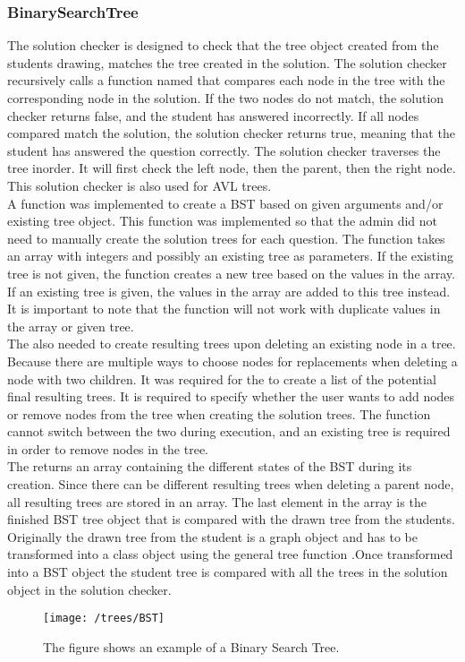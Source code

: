 \subsubsection{BinarySearchTree}
The solution checker is designed to check that the tree object created from the students drawing, matches the tree created in the solution. The solution checker recursively calls a function named  that compares each node in the tree with the corresponding node in the solution. If the two nodes do not match, the solution checker returns false, and the student has answered incorrectly. If all nodes compared match the solution, the solution checker returns true, meaning that the student has answered the question correctly. The solution checker traverses the tree inorder. It will first check the left node, then the parent, then the right node. This solution checker is also used for AVL trees.
\\[11pt]
A function  was implemented to create a BST based on given arguments and/or existing tree object. This function was implemented so that the admin did not need to manually create the solution trees for each question. The function takes an array with integers and possibly an existing tree as parameters. If the existing tree is not given, the function creates a new tree based on the values in the array. If an existing tree is given, the values in the array are added to this tree instead. It is important to note that the function will not work with duplicate values in the array or given tree.
\\[11pt]
The  also needed to create resulting trees upon deleting an existing node in a tree. Because there are multiple ways to choose nodes for replacements when deleting a node with two children.\cite{BinaryTree} It was required for the  to create a list of the potential final resulting trees. It is required to specify whether the user wants to add nodes or remove nodes from the tree when creating the solution trees. The function cannot switch between the two during execution, and an existing tree is required in order to remove nodes in the tree.
\\[11pt]
The  returns an array containing the different states of the BST during its creation. Since there can be different resulting trees when deleting a parent node, all resulting trees are stored in an array. The last element in the array is the finished BST tree object that is compared with the drawn tree from the students. Originally the drawn tree from the student is a graph object and has to be transformed into a  class object using the general tree function .Once transformed into a BST object the student tree is compared with all the trees in the solution object in the solution checker.
\begin{figure}[H]
    \centering
    \texttt{[image: /trees/BST]}
    \caption{The figure shows an example of a Binary Search Tree.}    
    \label{fig:BST}
\end{figure}